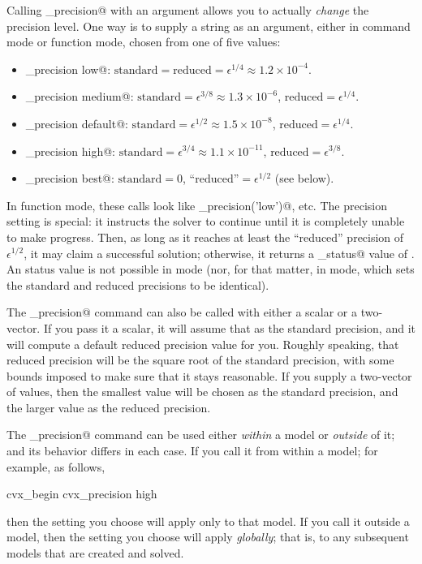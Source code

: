 \documentclass[12pt]{article}
\begin{document}
Calling \verb@cvx_precision@ with an argument allows you to actually \emph{change} the
precision level. One way is to supply a string as an argument, either in command mode
or function mode, chosen from one of five values:
\begin{itemize}
	\item \verb@cvx_precision low@:      $\text{standard} = \text{reduced} = \epsilon^{1/4} \approx 1.2\times10^{-4}$.
	\item \verb@cvx_precision medium@:   $\text{standard} = \epsilon^{3/8} \approx 1.3\times10^{-6}$, $\text{reduced} = \epsilon^{1/4}$.
	\item \verb@cvx_precision default@:  $\text{standard} = \epsilon^{1/2} \approx 1.5\times10^{-8}$, $\text{reduced} = \epsilon^{1/4}$.
	\item \verb@cvx_precision high@:     $\text{standard} = \epsilon^{3/4} \approx 1.1\times10^{-11}$, $\text{reduced} = \epsilon^{3/8}$.
	\item \verb@cvx_precision best@:     $\text{standard} = 0$, $\text{``reduced''} = \epsilon^{1/2}$  (see below).
\end{itemize}
In function mode, these calls look like \verb@cvx_precision('low')@, etc.
The \verb@best@ precision setting is special: it instructs the solver to continue until it is
completely unable to make progress. Then, as long as it reaches at least the ``reduced'' precision
of $\epsilon^{1/2}$, it may claim a successful solution; otherwise,
it returns a \verb@cvx_status@ value of \verb@Failed@. An \verb@Inaccurate@ status value is 
not possible in \verb@best@ mode (nor, for that matter, in \verb@low@ mode, which
sets the standard and reduced precisions to be identical).

The \verb@cvx_precision@ command can also be called with either a scalar or a
two-vector. If you pass it a scalar, it will assume that as the standard
precision, and it will compute a default reduced precision value for you.
Roughly speaking, that reduced precision will be the square root of the standard
precision, with some bounds imposed to make sure that it stays reasonable. If
you supply a two-vector of values, then the smallest value will be chosen as
the standard precision, and the larger value as the reduced precision.

The \verb@cvx_precision@ command can be used either \emph{within} a \cvx model or
\emph{outside} of it; and its behavior differs in each case. If you call it from
within a model; for example, as follows,
\begin{code}
	cvx_begin
	    cvx_precision high
\end{code}
then the setting you choose will apply only to that model. If you call it outside
a model, then the setting you choose will apply \emph{globally}; that is, to any
subsequent models that are created and solved.
\end{document}
